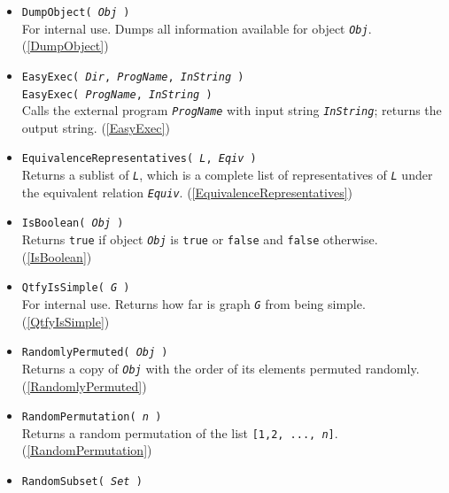 \documentclass[a4paper,11pt]{report}
\begin{document}
{{\begin{itemize}
\item \texttt{DumpObject( \mbox{\texttt{\mdseries\slshape Obj}} )}\\
 For internal use. Dumps all information available for object \mbox{\texttt{\mdseries\slshape Obj}}. (\ref{DumpObject}) 
\item \texttt{EasyExec( \mbox{\texttt{\mdseries\slshape Dir}}, \mbox{\texttt{\mdseries\slshape ProgName}}, \mbox{\texttt{\mdseries\slshape InString}} )}\\
 \texttt{EasyExec( \mbox{\texttt{\mdseries\slshape ProgName}}, \mbox{\texttt{\mdseries\slshape InString}} )}\\
 Calls the external program \mbox{\texttt{\mdseries\slshape ProgName}} with input string \mbox{\texttt{\mdseries\slshape InString}}; returns the output string. (\ref{EasyExec}) 
\item \texttt{EquivalenceRepresentatives( \mbox{\texttt{\mdseries\slshape L}}, \mbox{\texttt{\mdseries\slshape Eqiv}} )}\\
 Returns a sublist of \mbox{\texttt{\mdseries\slshape L}}, which is a complete list of representatives of \mbox{\texttt{\mdseries\slshape L}} under the equivalent relation \mbox{\texttt{\mdseries\slshape Equiv}}. (\ref{EquivalenceRepresentatives}) 
\item \texttt{IsBoolean( \mbox{\texttt{\mdseries\slshape Obj}} )}\\
 Returns \texttt{true} if object \mbox{\texttt{\mdseries\slshape Obj}} is \texttt{true} or \texttt{false} and \texttt{false} otherwise. (\ref{IsBoolean}) 
\item \texttt{QtfyIsSimple( \mbox{\texttt{\mdseries\slshape G}} )}\\
 For internal use. Returns how far is graph \mbox{\texttt{\mdseries\slshape G}} from being simple. (\ref{QtfyIsSimple}) 
\item \texttt{RandomlyPermuted( \mbox{\texttt{\mdseries\slshape Obj}} )}\\
 Returns a copy of \mbox{\texttt{\mdseries\slshape Obj}} with the order of its elements permuted randomly. (\ref{RandomlyPermuted}) 
\item \texttt{RandomPermutation( \mbox{\texttt{\mdseries\slshape n}} )}\\
 Returns a random permutation of the list \texttt{[1,2, ..., \mbox{\texttt{\mdseries\slshape n}}]}. (\ref{RandomPermutation}) 
\item \texttt{RandomSubset( \mbox{\texttt{\mdseries\slshape Set}} )}\\

\end{itemize}}}
\end{document}
